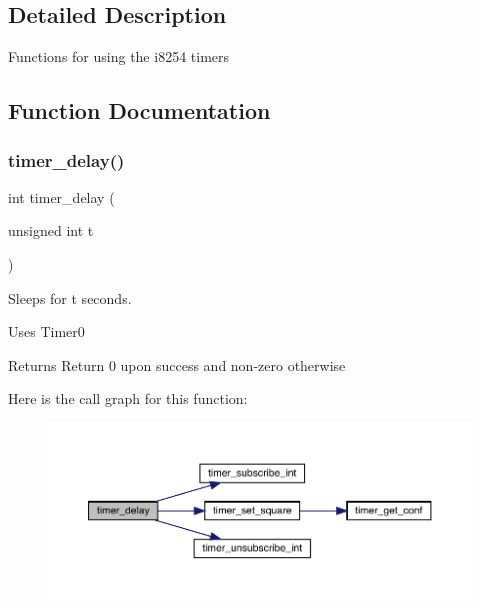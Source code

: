 \subsection{Detailed Description}
Functions for using the i8254 timers 

\subsection{Function Documentation}
\hypertarget{group__timer_ga7487d2df58374e7945748561966a03fb}{}\label{group__timer_ga7487d2df58374e7945748561966a03fb} 
\subsubsection{\texorpdfstring{timer\+\_\+delay()}{timer\_delay()}}
{\footnotesize\ttfamily int timer\+\_\+delay (\begin{DoxyParamCaption}\item[{unsigned int}]{t }\end{DoxyParamCaption})}



Sleeps for t seconds. 

Uses Timer0

\begin{DoxyReturn}{Returns}
Return 0 upon success and non-\/zero otherwise 
\end{DoxyReturn}
Here is the call graph for this function\+:\nopagebreak
\begin{figure}[H]
\begin{center}
\leavevmode
\includegraphics[width=350pt]{group__timer_ga7487d2df58374e7945748561966a03fb_cgraph}
\end{center}
\end{figure}
\hypertarget{group__timer_ga8eb3357bc05265afc4bea5bbbb480a53}{}\label{group__timer_ga8eb3357bc05265afc4bea5bbbb480a53} 
